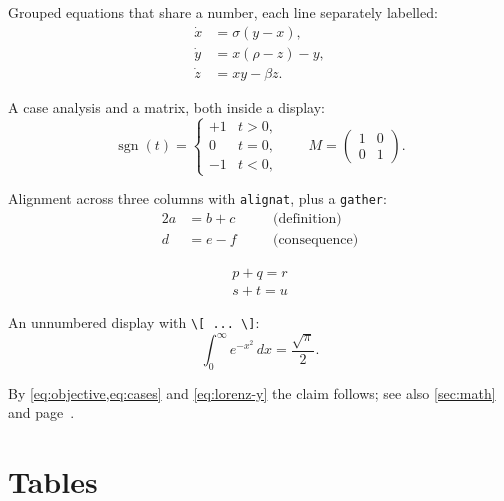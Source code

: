 \documentclass[11pt,twoside]{article}
\begin{document}
Grouped equations that share a number, each line separately labelled:
\begin{subequations}
  \label{eq:system}
  \begin{align}
    \dot{x} &= \sigma (y - x),          \label{eq:lorenz-x} \\
    \dot{y} &= x(\rho - z) - y,         \label{eq:lorenz-y} \\
    \dot{z} &= xy - \beta z .           \label{eq:lorenz-z}
  \end{align}
\end{subequations}

A case analysis and a matrix, both inside a display:
\begin{equation}
  \label{eq:cases}
  \operatorname{sgn}(t) =
  \begin{cases}
    +1 & t > 0, \\
     0 & t = 0, \\
    -1 & t < 0,
  \end{cases}
  \qquad
  M = \begin{pmatrix}
    1 & 0 \\
    0 & 1
  \end{pmatrix}.
\end{equation}

Alignment across three columns with \texttt{alignat}, plus a \texttt{gather}:
\begin{alignat}{2}
  a &= b + c    &\quad& \text{(definition)} \label{eq:alignat-1} \\
  d &= e - f    &&      \text{(consequence)} \label{eq:alignat-2}
\end{alignat}

\begin{gather*}
  p + q = r \\
  s + t = u
\end{gather*}

An unnumbered display with \verb|\[ ... \]|: \[ \int_0^\infty e^{-x^2}\,dx =
\frac{\sqrt{\pi}}{2}. \]

By \cref{eq:objective,eq:cases} and \eqref{eq:lorenz-y} the claim follows; see
also \autoref{sec:math} and page~\pageref{sec:tables}.

\section{Tables}
\label{sec:tables}
\end{document}
